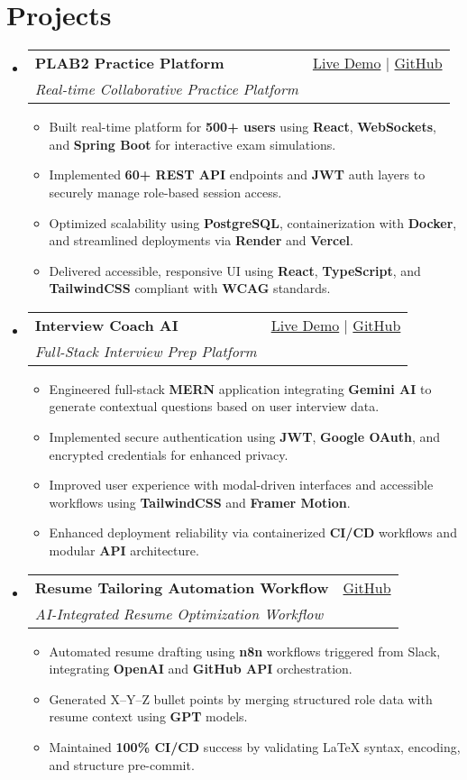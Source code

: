 \documentclass[letterpaper,11pt]{article}
\makeatletter
\newcommand{\resumeItem}[1]{\item\small{#1 \vspace{-2pt}}}
\newcommand{\resumeSubheading}[4]{
  \vspace{-1pt}\item
    \begin{tabular*}{0.97\textwidth}[t]{l@{\extracolsep{\fill}}r}
      \textbf{#1} & #2 \\
      \textit{\small#3} & \textit{\small #4} \\
    \end{tabular*}\vspace{-5pt}
}
\newcommand{\resumeSubHeadingListStart}{\begin{itemize}[leftmargin=*]}
\newcommand{\resumeSubHeadingListEnd}{\end{itemize}}
\newcommand{\resumeItemListStart}{\begin{itemize}}
\newcommand{\resumeItemListEnd}{\end{itemize}\vspace{-5pt}}
\makeatother
\begin{document}
\section{Projects}
  \resumeSubHeadingListStart
    \resumeSubheading
      {\textbf{PLAB2 Practice Platform}}{\href{https://plab2practice.com}{Live Demo} | \href{https://github.com/altansaid/plab2projectnew}{GitHub}}
      {Real-time Collaborative Practice Platform}{}
      \resumeItemListStart
        \resumeItem{Built real-time platform for \textbf{500+ users} using \textbf{React}, \textbf{WebSockets}, and \textbf{Spring Boot} for interactive exam simulations.}
        \resumeItem{Implemented \textbf{60+ REST API} endpoints and \textbf{JWT} auth layers to securely manage role-based session access.}
        \resumeItem{Optimized scalability using \textbf{PostgreSQL}, containerization with \textbf{Docker}, and streamlined deployments via \textbf{Render} and \textbf{Vercel}.}
        \resumeItem{Delivered accessible, responsive UI using \textbf{React}, \textbf{TypeScript}, and \textbf{TailwindCSS} compliant with \textbf{WCAG} standards.}
      \resumeItemListEnd

    \resumeSubheading
      {\textbf{Interview Coach AI}}{\href{https://interviewcoach-ai.vercel.app}{Live Demo} | \href{https://github.com/altansaid/interviewcoach-ai}{GitHub}}
      {Full-Stack Interview Prep Platform}{}
      \resumeItemListStart
        \resumeItem{Engineered full-stack \textbf{MERN} application integrating \textbf{Gemini AI} to generate contextual questions based on user interview data.}
        \resumeItem{Implemented secure authentication using \textbf{JWT}, \textbf{Google OAuth}, and encrypted credentials for enhanced privacy.}
        \resumeItem{Improved user experience with modal-driven interfaces and accessible workflows using \textbf{TailwindCSS} and \textbf{Framer Motion}.}
        \resumeItem{Enhanced deployment reliability via containerized \textbf{CI/CD} workflows and modular \textbf{API} architecture.}
      \resumeItemListEnd

    \resumeSubheading
      {\textbf{Resume Tailoring Automation Workflow}}{\href{https://github.com/altansaid/resume-updates}{GitHub}}{AI-Integrated Resume Optimization Workflow}{}
      \resumeItemListStart
        \resumeItem{Automated resume drafting using \textbf{n8n} workflows triggered from Slack, integrating \textbf{OpenAI} and \textbf{GitHub API} orchestration.}
        \resumeItem{Generated X--Y--Z bullet points by merging structured role data with resume context using \textbf{GPT} models.}
        \resumeItem{Maintained \textbf{100\% CI/CD} success by validating \LaTeX{} syntax, encoding, and structure pre-commit.}
      \resumeItemListEnd
  \resumeSubHeadingListEnd
\end{document}
